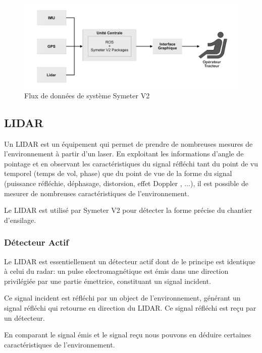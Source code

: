 \documentclass[12pt,a4paper]{report}
\begin{document}
		\begin{figure}[h]
			\centering
			\includegraphics[width=0.9\linewidth]{img/fluxdonneeSymeterV2}
			\caption[fluxdonnéesymv2]{Flux de données de système Symeter V2}
			\label{fig:fluxdonneesymeterv2}
		\end{figure}
			
		\subsection{LIDAR}
		Un LIDAR est un équipement qui permet de prendre de nombreuses mesures de l'environnement à partir d'un laser. En exploitant les informations d'angle de pointage et en observant les caractéristiques du signal réfléchi tant du point de vu temporel (temps de vol, phase) que du point de vue de la forme du signal (puissance réfléchie, déphasage, distorsion, effet Doppler , ...), il est possible de mesurer de nombreuses caractéristiques de l'environnement.
		
		\para Le LIDAR est utilisé par Symeter V2 pour détecter la forme précise du chantier d'ensilage.
		
		\subsubsection{Détecteur Actif}
		Le LIDAR est essentiellement un détecteur actif dont de le principe est identique à celui du radar: un pulse electromagnétique est émis dans une direction privilégiée par une partie émettrice, constituant un signal incident. 
		
		\para Ce signal incident est réfléchi par un object de l'environnement, générant un signal réfléchi qui retourne en direction du LIDAR. Ce signal réfléchi est reçu par un détecteur. 
		
		\para En comparant le signal émis et le signal reçu nous pouvons en déduire certaines caractéristiques de l'environnement.
		
\end{document}
